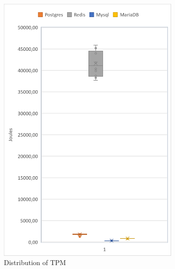    \begin{figure}[!ht]
        \centering
        \begin{subfigure}[b]{0.33\textwidth}
            \centering
			\includegraphics[width=1\columnwidth]{results/boxplot/10m/TPM.png}
			\caption[]%
            {{\small Distribution of TPM}}    
			\label{fig:bocplothammerTPM10m}
        \end{subfigure}
        \begin{subfigure}[b]{0.33\textwidth}  
            \centering 

\end{subfigure}
\end{figure}
